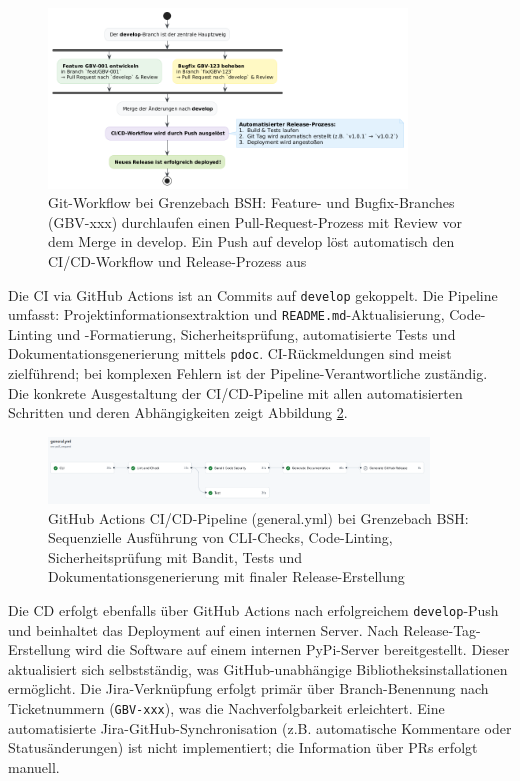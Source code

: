 \documentclass[12pt,oneside]{article}
\begin{document}
    \begin{figure}[H]
        \centering
        \includegraphics[width=0.85\textwidth]{images/git_branching}
        \caption{Git-Workflow bei Grenzebach BSH: Feature- und Bugfix-Branches (GBV-xxx) durchlaufen einen Pull-Request-Prozess mit Review vor dem Merge in develop. Ein Push auf develop löst automatisch den CI/CD-Workflow und Release-Prozess aus}
        \label{fig:git_branching}
    \end{figure}
    \noindent
    Die CI via GitHub Actions ist an Commits auf \texttt{develop} gekoppelt. Die Pipeline umfasst: Projektinformationsextraktion und \texttt{README.md}-Aktualisierung, Code-Linting und -Formatierung, Sicherheitsprüfung, automatisierte Tests und Dokumentationsgenerierung mittels \texttt{pdoc}. CI-Rückmeldungen sind meist zielführend; bei komplexen Fehlern ist der Pipeline-Verantwortliche zuständig.
Die konkrete Ausgestaltung der CI/CD-Pipeline mit allen automatisierten Schritten und deren Abhängigkeiten zeigt Abbildung \ref{fig:git_workflow}.

    \begin{figure}[H]
        \centering
        \includegraphics[width=0.9\textwidth]{images/git_workflow}
        \caption{GitHub Actions CI/CD-Pipeline (general.yml) bei Grenzebach BSH: Sequenzielle Ausführung von CLI-Checks, Code-Linting, Sicherheitsprüfung mit Bandit, Tests und Dokumentationsgenerierung mit finaler Release-Erstellung}
        \label{fig:git_workflow}
    \end{figure}

    \noindent
    Die CD erfolgt ebenfalls über GitHub Actions nach erfolgreichem \texttt{develop}-Push und beinhaltet das Deployment auf einen internen Server. Nach Release-Tag-Erstellung wird die Software auf einem internen PyPi-Server bereitgestellt. Dieser aktualisiert sich selbstständig, was GitHub-unabhängige Bibliotheksinstallationen ermöglicht.
    \newline
    Die Jira-Verknüpfung erfolgt primär über Branch-Benennung nach Ticketnummern (\texttt{GBV-xxx}), was die Nachverfolgbarkeit erleichtert. Eine automatisierte Jira-GitHub-Synchronisation (z.B. automatische Kommentare oder Statusänderungen) ist nicht implementiert; die Information über PRs erfolgt manuell.
\end{document}
